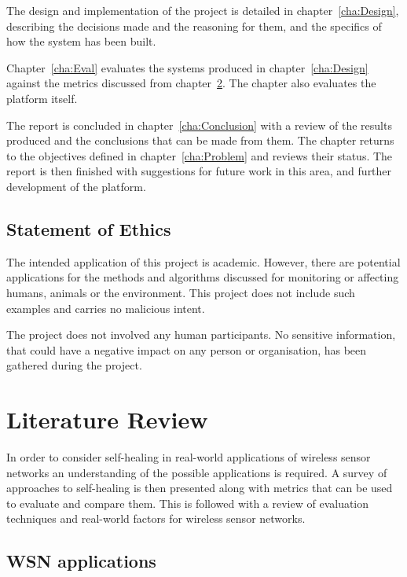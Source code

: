 \documentclass[authoryearcitations]{UoYCSproject}
\begin{document}
The design and implementation of the project is detailed in chapter~\ref{cha:Design}, describing the decisions made and the reasoning for them, and the specifics of how the system has been built.

Chapter~\ref{cha:Eval} evaluates the systems produced in chapter~\ref{cha:Design} against the metrics discussed from chapter~\ref{cha:LitReview}. The chapter also evaluates the platform itself.

The report is concluded in chapter~\ref{cha:Conclusion} with a review of the results produced and the conclusions that can be made from them. The chapter returns to the objectives defined in chapter~\ref{cha:Problem} and reviews their status. The report is then finished with suggestions for future work in this area, and further development of the platform.

\section{Statement of Ethics}

The intended application of this project is academic. However, there are potential applications for the methods and algorithms discussed for monitoring or affecting humans, animals or the environment. This project does not include such examples and carries no malicious intent.

The project does not involved any human participants. No sensitive information, that could have a negative impact on any person or organisation, has been gathered during the project.

\chapter{Literature Review}
\label{cha:LitReview}


In order to consider self-healing in real-world applications of wireless sensor networks an understanding of the possible applications is required. A survey of approaches to self-healing is then presented along with metrics that can be used to evaluate and compare them. This is followed with a review of evaluation techniques and real-world factors for wireless sensor networks.

\section{WSN applications}
\end{document}
